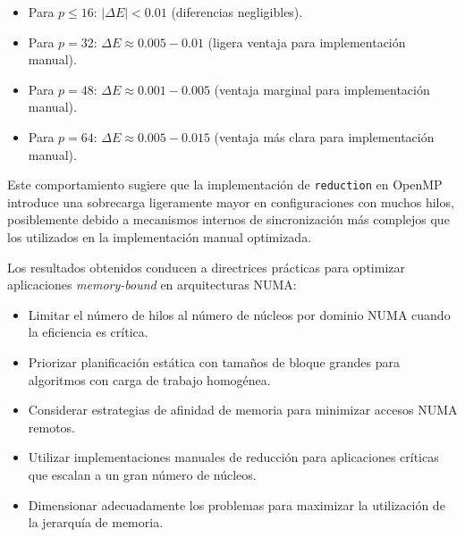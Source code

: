         \begin{itemize}
        
            \item Para $p \leq 16$: $|\Delta E| < 0.01$ (diferencias negligibles).
            
            \item Para $p = 32$: $\Delta E \approx 0.005-0.01$ (ligera ventaja para implementación manual).
            
            \item Para $p = 48$: $\Delta E \approx 0.001-0.005$ (ventaja marginal para implementación manual).
            
            \item Para $p = 64$: $\Delta E \approx 0.005-0.015$ (ventaja más clara para implementación manual).
            
        \end{itemize}

        Este comportamiento sugiere que la implementación de \texttt{reduction} en OpenMP introduce una sobrecarga ligeramente mayor en configuraciones con muchos hilos, posiblemente debido a mecanismos internos de sincronización más complejos que los utilizados en la implementación manual optimizada.
        
        Los resultados obtenidos conducen a directrices prácticas para optimizar aplicaciones \textit{memory-bound} en arquitecturas NUMA:
        
        \begin{itemize}
        
            \item Limitar el número de hilos al número de núcleos por dominio NUMA cuando la eficiencia es crítica.
            
            \item Priorizar planificación estática con tamaños de bloque grandes para algoritmos con carga de trabajo homogénea.
            
            \item Considerar estrategias de afinidad de memoria para minimizar accesos NUMA remotos.
            
            \item Utilizar implementaciones manuales de reducción para aplicaciones críticas que escalan a un gran número de núcleos.
            
            \item Dimensionar adecuadamente los problemas para maximizar la utilización de la jerarquía de memoria.
            
        \end{itemize}
        
